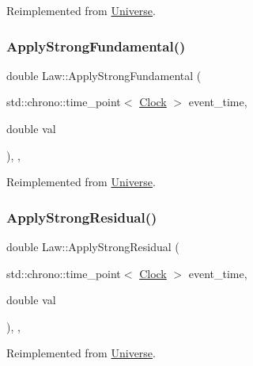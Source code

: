 Reimplemented from \mbox{\hyperlink{classUniverse_a906a88b37f10bfa630bef49dfd0e907a}{Universe}}.

\mbox{\label{classLaw_a57d05f26e1c0ee953260ebd3780248f8}} 
\subsubsection{\texorpdfstring{Apply\+Strong\+Fundamental()}{ApplyStrongFundamental()}}
{\footnotesize\ttfamily double Law\+::\+Apply\+Strong\+Fundamental (\begin{DoxyParamCaption}\item[{std\+::chrono\+::time\+\_\+point$<$ \mbox{\hyperlink{universe_8h_a0ef8d951d1ca5ab3cfaf7ab4c7a6fd80}{Clock}} $>$}]{event\+\_\+time,  }\item[{double}]{val }\end{DoxyParamCaption})\hspace{0.3cm}{\ttfamily [inline]}, {\ttfamily [final]}, {\ttfamily [virtual]}}



Reimplemented from \mbox{\hyperlink{classUniverse_a62789bcff84bd750b0366004381e2fdd}{Universe}}.

\mbox{\label{classLaw_a266f86cdcc01e813249a2f192ab85eb3}} 
\subsubsection{\texorpdfstring{Apply\+Strong\+Residual()}{ApplyStrongResidual()}}
{\footnotesize\ttfamily double Law\+::\+Apply\+Strong\+Residual (\begin{DoxyParamCaption}\item[{std\+::chrono\+::time\+\_\+point$<$ \mbox{\hyperlink{universe_8h_a0ef8d951d1ca5ab3cfaf7ab4c7a6fd80}{Clock}} $>$}]{event\+\_\+time,  }\item[{double}]{val }\end{DoxyParamCaption})\hspace{0.3cm}{\ttfamily [inline]}, {\ttfamily [final]}, {\ttfamily [virtual]}}



Reimplemented from \mbox{\hyperlink{classUniverse_af7becebb347be9a85541d96a3eca1ca7}{Universe}}.

